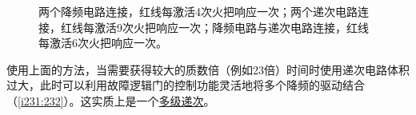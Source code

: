 \begin{figure}[!ht]
\begin{center}
\qquad
{}
\qquad
{}
\end{center}
\caption{\protect{}两个降频电路连接，红线每激活4次火把响应一次；\protect{}两个递次电路连接，红线每激活9次火把响应一次；\protect{}降频电路与递次电路连接，红线每激活6次火把响应一次。}
\label{i223:228}
\end{figure}

使用上面的方法，当需要获得较大的质数倍（例如23倍）时间时使用递次电路体积过大，此时可以利用故障逻辑门的控制功能灵活地将多个降频的驱动结合（\autoref{i231:232}）。这实质上是一个\hyperref[sec5]{多级递次}。

